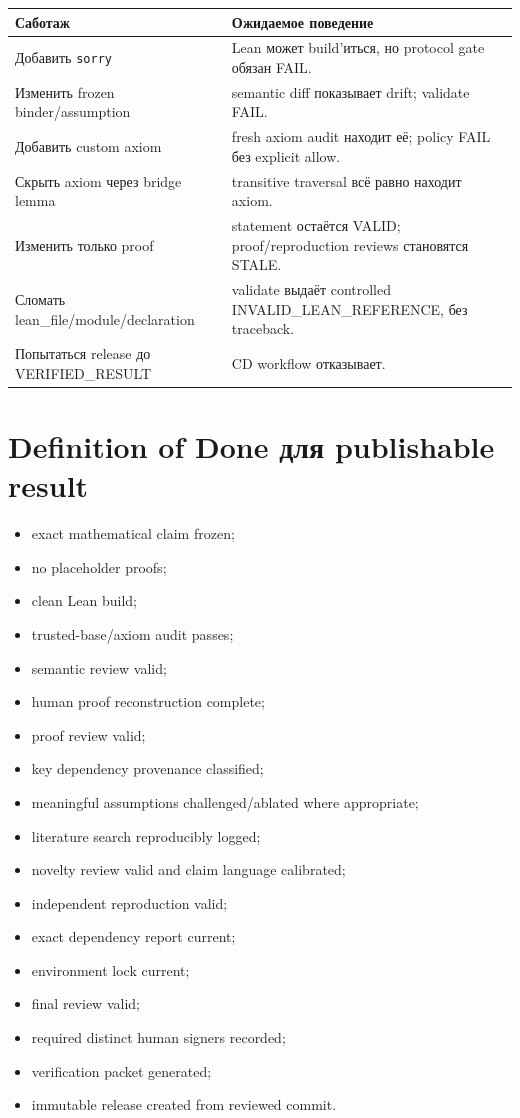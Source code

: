 \documentclass[11pt,a4paper]{article}
\begin{document}
\begin{tabularx}{\textwidth}{@{}p{}Y@{}}
\toprule
Саботаж & Ожидаемое поведение \\
\midrule
Добавить \texttt{sorry} & Lean может build'иться, но protocol gate обязан FAIL. \\
Изменить frozen binder/assumption & semantic diff показывает drift; validate FAIL. \\
Добавить custom axiom & fresh axiom audit находит её; policy FAIL без explicit allow. \\
Скрыть axiom через bridge lemma & transitive traversal всё равно находит axiom. \\
Изменить только proof & statement остаётся VALID; proof/reproduction reviews становятся STALE. \\
Сломать lean\_file/module/declaration & validate выдаёт controlled INVALID\_LEAN\_REFERENCE, без traceback. \\
Попытаться release до VERIFIED\_RESULT & CD workflow отказывает. \\
\bottomrule
\end{tabularx}

\section{Definition of Done для publishable result}

\begin{checklistbox}
\begin{itemize}
\item exact mathematical claim frozen;
\item no placeholder proofs;
\item clean Lean build;
\item trusted-base/axiom audit passes;
\item semantic review valid;
\item human proof reconstruction complete;
\item proof review valid;
\item key dependency provenance classified;
\item meaningful assumptions challenged/ablated where appropriate;
\item literature search reproducibly logged;
\item novelty review valid and claim language calibrated;
\item independent reproduction valid;
\item exact dependency report current;
\item environment lock current;
\item final review valid;
\item required distinct human signers recorded;
\item verification packet generated;
\item immutable release created from reviewed commit.
\end{itemize}
\end{checklistbox}
\end{document}
